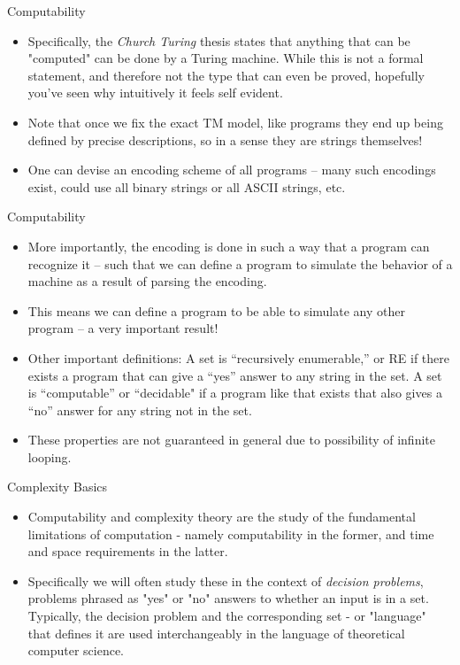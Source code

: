 \documentclass[aspectratio=169]{beamer}
\begin{document}
\begin{frame}{Computability}
  
  \begin{itemize}
    \item Specifically, the \emph{Church Turing} thesis states that anything that can be "computed" can be done by a Turing machine. While this is not a formal statement, and therefore not the type that can even be proved, hopefully you've seen why intuitively it feels self evident. \pause
    \item Note that once we fix the exact TM model, like programs they end up being defined by precise descriptions, so in a sense they are strings themselves! \pause
    \item One can devise an encoding scheme of all programs -- many such encodings exist, could use all binary strings or all ASCII strings, etc.
  \end{itemize}
\end{frame}

\begin{frame}{Computability}
  
  \begin{itemize}
    \item More importantly, the encoding is done in such a way that a program can recognize it -- such that we can define a program to simulate the behavior of a machine as a result of parsing the encoding. \pause
    \item This means we can define a program to be able to simulate any other program -- a very important result! \pause
    \item Other important definitions: A set is ``recursively enumerable,'' or RE if there exists a program that can give a ``yes'' answer to any string in the set. A set is ``computable'' or ``decidable" if a program like that exists that also gives a ``no'' answer for any string not in the set. \pause
    \item These properties are not guaranteed in general due to possibility of infinite looping.
  \end{itemize}
\end{frame}

\begin{frame}{Complexity Basics}
  
  \begin{itemize}
    \item Computability and complexity theory are the study of the fundamental limitations of computation - namely computability in the former, and time and space requirements in the latter. \pause 
    \item Specifically we will often study these in the context of \emph{decision problems}, problems phrased as "yes" or "no" answers to whether an input is in a set. Typically, the decision problem and the corresponding set - or "language" that defines it are used interchangeably in the language of theoretical computer science. 
  \end{itemize}
\end{frame}
\end{document}
